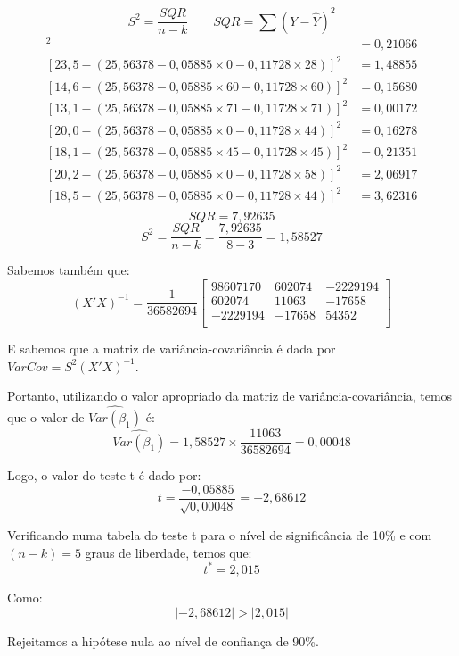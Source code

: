 \documentclass[]{ufpe-exercises}
\begin{document}
\begin{questions}
\begin{parts}
\begin{solution}
			\[
				S^{2} = \frac{SQR}{n - k} \qquad
				SQR = \sum (Y - \hat{Y})^{2}
			\]
			\begin{align*}
				[21,0 - (25,56378 - 0,05885 \times 0  - 0,11728 \times 35 )]^{2} & = 0,21066 \\
				[23,5 - (25,56378 - 0,05885 \times 0  - 0,11728 \times 28 )]^{2} & = 1,48855 \\
				[14,6 - (25,56378 - 0,05885 \times 60 - 0,11728 \times 60 )]^{2} & = 0,15680 \\
				[13,1 - (25,56378 - 0,05885 \times 71 - 0,11728 \times 71 )]^{2} & = 0,00172 \\
				[20,0 - (25,56378 - 0,05885 \times 0  - 0,11728 \times 44 )]^{2} & = 0,16278 \\
				[18,1 - (25,56378 - 0,05885 \times 45 - 0,11728 \times 45 )]^{2} & = 0,21351 \\
				[20,2 - (25,56378 - 0,05885 \times 0  - 0,11728 \times 58 )]^{2} & = 2,06917 \\
				[18,5 - (25,56378 - 0,05885 \times 0  - 0,11728 \times 44 )]^{2} & = 3,62316 \\
			\end{align*}
			\[ SQR = 7,92635 \]
			\[ S^{2} = \frac{SQR}{n - k} = \frac{7,92635}{8 - 3} = 1,58527 \]

			Sabemos também que:
			\[
				(X'X)^{-1} = \frac{1}{36582694}
				\begin{bmatrix}
					98607170 & 602074 & -2229194 \\
					602074   & 11063  & -17658   \\
					-2229194 & -17658 & 54352    \\
				\end{bmatrix}
			\]

			E sabemos que a matriz de variância-covariância é dada por \(VarCov = S^{2}(X'X)^{-1}\).

			Portanto, utilizando o valor apropriado da matriz de variância-covariância, temos que o valor de \(\widehat{Var(\beta_{1})}\) é:
			\[ \widehat{Var(\beta_{1})} = 1,58527 \times \frac{11063}{36582694} = 0,00048 \]

			Logo, o valor do teste t é dado por:
			\[ t = \frac{-0,05885}{\sqrt{0,00048}} = -2,68612 \]

			Verificando numa tabela do teste t para o nível de significância de 10\% e com \((n - k) = 5\) graus de liberdade, temos que:
			\[ t^{*} = 2,015 \]

			Como:
			\[\lvert -2,68612 \rvert > \lvert 2,015 \rvert\]

			Rejeitamos a hipótese nula ao nível de confiança de 90\%.

		\end{solution}

	\end{parts}

\end{questions}
\end{document}
